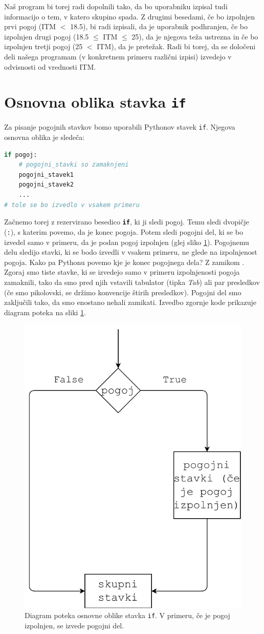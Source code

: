 Naš program bi torej radi dopolnili tako, da bo uporabniku izpisal tudi informacijo o tem, v katero skupino spada. Z drugimi besedami, če bo izpolnjen prvi pogoj (ITM $<$ 18.5), bi radi izpisali, da je uporabnik podhranjen, če bo izpolnjen drugi pogoj (18.5 $\leq$ ITM $\leq$ 25), da je njegova teža ustrezna in če bo izpolnjen tretji pogoj (25 $<$ ITM), da je pretežak. Radi bi torej, da se določeni deli našega programam (v konkretnem primeru različni izpisi) izvedejo v odvisnosti od vrednosti ITM. 

\section{Osnovna oblika stavka \texttt{if}}

Za pisanje pogojnih stavkov bomo uporabili Pythonov stavek \texttt{if}. Njegova osnovna oblika je sledeča:
\begin{lstlisting}[language=Python]
if pogoj:
    # pogojni_stavki so zamaknjeni
    pogojni_stavek1
    pogojni_stavek2
    ...
# tole se bo izvedlo v vsakem primeru
\end{lstlisting}
Začnemo torej z rezervirano besedico \textbf{\texttt{if}}, ki ji sledi pogoj. Temu sledi dvopičje (\texttt{:}), s katerim povemo, da je konec pogoja. Potem sledi pogojni del, ki se bo izvedel samo v primeru, da je podan pogoj izpolnjen (glej sliko \ref{img:if1}). Pogojnemu delu sledijo stavki, ki se bodo izvedli v vsakem primeru, ne glede na izpolnjenost pogoja. Kako pa Pythonu povemo kje je konec pogojnega dela? Z zamikom . Zgoraj smo tiste stavke, ki se izvedejo samo v primeru izpolnjenosti pogoja zamaknili, tako da smo pred njih vstavili tabulator (tipka \emph{Tab}) ali par presledkov (če smo pikolovski, se držimo konvencije štirih presledkov). Pogojni del smo zaključili tako, da smo enostano nehali zamikati. Izvedbo zgornje kode prikazuje diagram poteka na sliki \ref{img:if1}.
\begin{figure}
    \centering
    \includegraphics[width=0.5\linewidth]{img/if1.pdf}
    \caption{Diagram poteka osnovne oblike stavka \texttt{if}. V primeru, če je pogoj izpolnjen, se izvede pogojni del.}
    \label{img:if1}
\end{figure}

